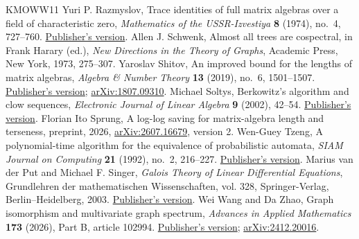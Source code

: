 \documentclass[11pt,letterpaper]{article}
\theoremstyle{definition}\newtheorem{definition}[theorem]{Definition}
\theoremstyle{remark}\newtheorem{remark}[theorem]{Remark}
\begin{document}
\begin{thebibliography}{KMOWW11}
 Yuri P. Razmyslov, Trace identities of full matrix algebras over a field of characteristic zero, \emph{Mathematics of the USSR-Izvestiya} \textbf{8} (1974), no.~4, 727--760. \href{https://doi.org/10.1070/IM1974v008n04ABEH002126}{Publisher's version}.
 Allen J. Schwenk, Almost all trees are cospectral, in Frank Harary (ed.), \emph{New Directions in the Theory of Graphs}, Academic Press, New York, 1973, 275--307.
 Yaroslav Shitov, An improved bound for the lengths of matrix algebras, \emph{Algebra \& Number Theory} \textbf{13} (2019), no.~6, 1501--1507. \href{https://doi.org/10.2140/ant.2019.13.1501}{Publisher's version}; \href{https://arxiv.org/abs/1807.09310}{arXiv:1807.09310}.
 Michael Soltys, Berkowitz's algorithm and clow sequences, \emph{Electronic Journal of Linear Algebra} \textbf{9} (2002), 42--54. \href{https://doi.org/10.13001/1081-3810.1072}{Publisher's version}.
 Florian Ito Sprung, A log-log saving for matrix-algebra length and terseness, preprint, 2026, \href{https://arxiv.org/abs/2607.16679v2}{arXiv:2607.16679}, version 2.
 Wen-Guey Tzeng, A polynomial-time algorithm for the equivalence of probabilistic automata, \emph{SIAM Journal on Computing} \textbf{21} (1992), no.~2, 216--227. \href{https://doi.org/10.1137/0221017}{Publisher's version}.
 Marius van der Put and Michael F. Singer, \emph{Galois Theory of Linear Differential Equations}, Grundlehren der mathematischen Wissenschaften, vol. 328, Springer-Verlag, Berlin--Heidelberg, 2003. \href{https://doi.org/10.1007/978-3-642-55750-7}{Publisher's version}.
 Wei Wang and Da Zhao, Graph isomorphism and multivariate graph spectrum, \emph{Advances in Applied Mathematics} \textbf{173} (2026), Part B, article 102994. \href{https://doi.org/10.1016/j.aam.2025.102994}{Publisher's version}; \href{https://arxiv.org/abs/2412.20016}{arXiv:2412.20016}.
\end{thebibliography}
\end{document}
